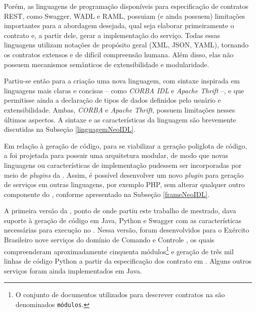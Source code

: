 Porém, as linguagens de programação disponíveis para especificação de
contratos REST, como Swagger\cite{swaggerSite}, WADL\cite{hadley2006web} e
RAML\cite{RAML}, possuiam (e ainda possuem) limitações importantes para a
abordagem desejada, qual seja elaborar primeiramente o contrato e, a
partir dele, gerar a implementação do serviço. Todas essas linguagens utilizam
notações de propósito geral (XML\cite{XML}, JSON\cite{JSon}, YAML\cite{YAML}),
tornando os contratos extensos e de difícil compreensão humana. Além disso,
elas não possuem mecanismos semânticos de extensibilidade e modularidade.

% 
% 


Partiu-se então para a criação uma nova linguagem, com sintaxe
inspirada em linguagens mais claras e concisas -- como \emph{CORBA
IDL}\texttrademark \cite{corba} e \emph{Apache
Thrift}\texttrademark\cite{thrift} --, e que permitisse ainda a declaração de
tipos de dados definidos pelo usuário e extensibilidade. Ambas, \emph{CORBA} e
\emph{Apache Thrift}, possuem limitações nesses últimos aspectos. A sintaxe e as
características da linguagem \neoidl{} são brevemente discutidas na Subseção
\ref{linguagemNeoIDL}.

Em relação à geração de código, para se viabilizar a geração poliglota de
código, a \neoidl{} foi projetada para possuir uma arquitetura modular, de modo
que novas linguagens ou características de implementação pudessem ser
incorporadas por meio de \textit{plugins} da \neoidl{}. Assim, é possível desenvolver um novo \textit{plugin} para geração de serviços em outras
linguagens, por exemplo PHP, sem alterar qualquer outro componente do \framework,
conforme apresentado na Subseção \ref{frameNeoIDL}.

A primeira versão da \neoidl{}, ponto de onde partiu este trabalho de mestrado,
dava suporte à geração de código em Java, Python e Swagger com as
características necessárias para execução no \neocortex{}. Nessa versão, foram
desenvolvidos para o Exército Brasileiro nove serviços do domínio de Comando e
Controle \cite{david:commandControl}, os quais compreenderam aproximadamente
cinquenta módulos\footnote{O conjunto de documentos
utilizados para descrever contratos na \neoidl{} são denominados
\texttt{módulos}.} e geração de três mil linhas de código Python a partir
da especificação dos contrato em \neoidl{}. Alguns outros serviços foram
ainda implementados em Java.




